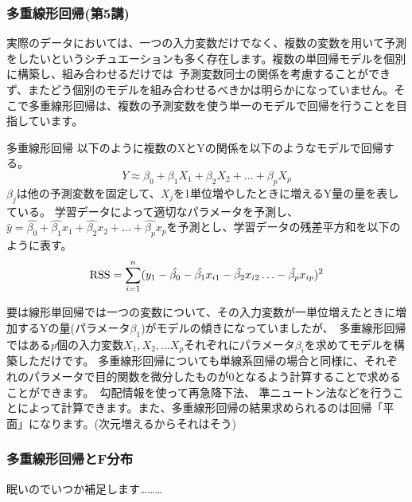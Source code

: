 \documentclass[uplatex]{jsarticle}
\begin{document}
\subsubsection{多重線形回帰(第5講)}
実際のデータにおいては、一つの入力変数だけでなく、複数の変数を用いて予測をしたいというシチュエーションも多く存在します。複数の単回帰モデルを個別に構築し、組み合わせるだけでは\
予測変数同士の関係を考慮することができず、またどう個別のモデルを組み合わせるべきかは明らかになっていません。そこで多重線形回帰は、複数の予測変数を使う単一のモデルで回帰を行うことを目指しています。
\begin{itembox}[l]{多重線形回帰}
  以下のように複数のXとYの関係を以下のようなモデルで回帰する。
    $$Y \approx \beta_0 + \beta_1X_1 + \beta_2X_2 + \ldots + \beta_pX_p$$
    $\beta_j$は他の予測変数を固定して、$X_j$を1単位増やしたときに増えるY量の量を表している。
    学習データによって適切なパラメータを予測し、$\hat{y} = \hat{\beta_0} + \hat{\beta_1}x_1 + \hat{\beta_2}x_2 + \dots + \hat{\beta_p}x_p$を予測とし、学習データの残差平方和を以下のように表す。
    $${\rm RSS} = \sum_{i=1}^n (y_1 - \hat{\beta_0} - \hat{\beta_1}x_{i1} - \hat{\beta_2}x_{i2} \ldots - \hat{\beta_p}x_{ip})^2 $$
\end{itembox}
要は線形単回帰では一つの変数について、その入力変数が一単位増えたときに増加するYの量(パラメータ$\beta_1$)がモデルの傾きになっていましたが、\
多重線形回帰ではある$p$個の入力変数$X_1, X_2, \ldots X_p$それぞれにパラメータ$\beta_i$を求めてモデルを構築しただけです。
多重線形回帰についても単線系回帰の場合と同様に、それぞれのパラメータで目的関数を微分したものが0となるよう計算することで求めることができます。\
勾配情報を使って再急降下法、 準ニュートン法などを行うことによって計算できます。また、多重線形回帰の結果求められるのは回帰「平面」になります。(次元増えるからそれはそう)

\subsubsection{多重線形回帰とF分布}
眠いのでいつか補足します………
\end{document}
